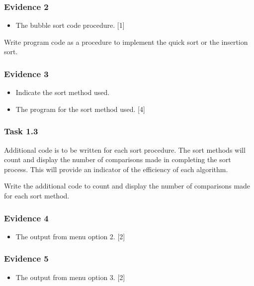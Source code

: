 \subsubsection*{Evidence 2}
\begin{itemize}
\item The bubble sort code procedure. \hfill{}{[}1{]}
\end{itemize}
Write program code as a procedure to implement the quick sort or the
insertion sort. 

\subsubsection*{Evidence 3}
\begin{itemize}
\item Indicate the sort method used.
\item The program for the sort method used. \hfill{}{[}4{]}
\end{itemize}


\subsubsection*{Task 1.3}

Additional code is to be written for each sort procedure. The sort
methods will count and display the number of comparisons made in completing
the sort process. This will provide an indicator of the efficiency
of each algorithm.

Write the additional code to count and display the number of comparisons
made for each sort method.

\subsubsection*{Evidence 4}
\begin{itemize}
\item The output from menu option 2. \hfill{} {[}2{]}
\end{itemize}

\subsubsection*{Evidence 5}
\begin{itemize}
\item The output from menu option 3. \hfill{} {[}2{]}
\end{itemize}